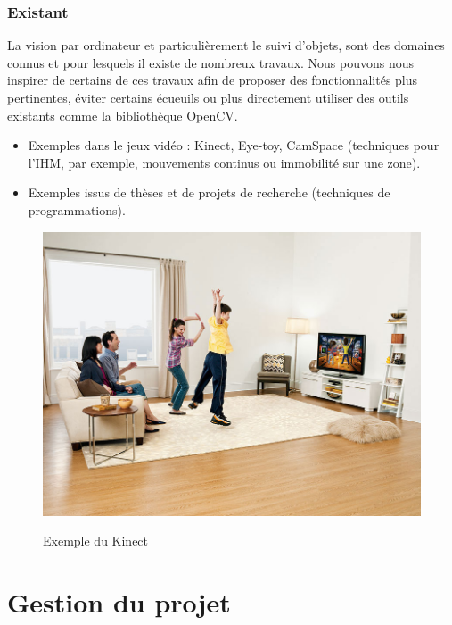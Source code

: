 \documentclass{report}
\begin{document}
		\subsubsection{Existant}
		La vision par ordinateur et particulièrement le suivi d'objets, sont des domaines connus et pour lesquels il existe de nombreux travaux. Nous pouvons nous inspirer de certains de ces travaux afin de proposer des fonctionnalités plus pertinentes, éviter certains écueuils ou plus directement utiliser des outils existants comme la bibliothèque OpenCV.\\
			\begin{itemize}
				\item Exemples dans le jeux vidéo : Kinect, Eye-toy, CamSpace (techniques pour l'IHM, par exemple, mouvements continus ou immobilité sur une zone).
				\item Exemples issus de thèses et de projets de recherche (techniques de programmations).
			\end{itemize}
			\begin{figure}[!h]
				\centering
				\includegraphics[scale=0.2]{../images/kinect_screen_lg.jpg}\\
				\caption{Exemple du Kinect}
				\label{Exemple du Kinect}
			\end{figure}
		\newpage
		\section{Gestion du projet}
\end{document}
